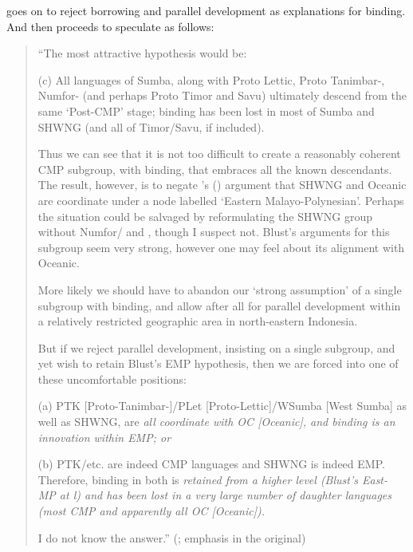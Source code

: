\citet[253]{Mills1991} goes on to reject borrowing
and parallel development as explanations for binding.
And then proceeds to speculate as follows:

\begin{quote}
		“The most attractive hypothesis would be:
		
		(c) All languages of
		Sumba, along with Proto Lettic,
		Proto Tanimbar-, Numfor- (and perhaps Proto Timor
		and Savu) ultimately descend from the same ‘Post-CMP’ stage;
		binding has been lost in most of Sumba
		and SHWNG (and all of Timor/Savu, if included).

		Thus we can see that it is not too difficult to create a reasonably
		coherent CMP subgroup, with binding, that embraces all the known descendants.
		The result, however, is to negate \citeauthor{Blust1978}’s (\citeyear{Blust1978}) argument that
		SHWNG and Oceanic are coordinate under a node labelled ‘Eastern Malayo-Polynesian’.
		Perhaps the situation could be salvaged by reformulating the
		SHWNG group without Numfor/
		and , though I suspect not.
		Blust’s arguments for this subgroup seem very strong,
		however one may feel about its alignment with Oceanic.

		More likely we should have to abandon our ‘strong assumption’
		of a single subgroup with binding,
		and allow after all for parallel development within a relatively
		restricted geographic area in north-eastern Indonesia.

		But if we reject parallel development,
		insisting on a single subgroup,
		and yet wish to retain Blust’s EMP hypothesis,
		then we are forced into one of these uncomfortable positions:

		(a) PTK [Proto-Tanimbar-]/PLet [Proto-Lettic]/WSumba [West
		Sumba] as well as SHWNG,
		are \it{all} coordinate with OC [Oceanic],
		and binding is an innovation within EMP; or
		
		(b) PTK/etc. are indeed CMP languages
		and SHWNG is indeed EMP.
		Therefore, binding in both is \it{retained} from a higher level (Blust’s
		East- MP at l)
		and has been lost in a very large number of daughter languages
		(most CMP and apparently all OC [Oceanic]).
		
		I do not know the answer.”
		(\citealp[253]{Mills1991}; emphasis in the original)
\end{quote}

